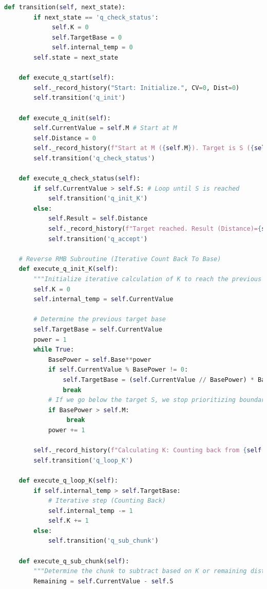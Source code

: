 \documentclass[11pt]{article}
\begin{document}
\begin{lstlisting}[language=Python]
    def transition(self, next_state):
        if next_state == 'q_check_status':
             self.K = 0
             self.TargetBase = 0
             self.internal_temp = 0
        self.state = next_state

    def execute_q_start(self):
        self._record_history("Start: Initialize.", CV=0, Dist=0)
        self.transition('q_init')

    def execute_q_init(self):
        self.CurrentValue = self.M # Start at M
        self.Distance = 0
        self._record_history(f"Start at M ({self.M}). Target is S ({self.S}).", CV=self.CurrentValue, Dist=self.Distance)
        self.transition('q_check_status')

    def execute_q_check_status(self):
        if self.CurrentValue > self.S: # Loop until S is reached
            self.transition('q_init_K')
        else:
            self.Result = self.Distance
            self._record_history(f"Target reached. Result (Distance)={self.Result}.", CV=self.CurrentValue, Dist=self.Distance)
            self.transition('q_accept')

    # Reverse RMB Subroutine (Iterative Count Back To Base)
    def execute_q_init_K(self):
        """Initialize iterative calculation of K to reach the previous base."""
        self.K = 0
        self.internal_temp = self.CurrentValue

        # Determine the previous target base
        self.TargetBase = self.CurrentValue
        power = 1
        while True:
            BasePower = self.Base**power
            if self.CurrentValue % BasePower != 0:
                self.TargetBase = (self.CurrentValue // BasePower) * BasePower
                break
            # If we go below the target S, we stop prioritizing boundaries.
            if BasePower > self.M:
                 break
            power += 1

        self._record_history(f"Calculating K: Counting back from {self.CurrentValue} to {self.TargetBase}.", CV=self.CurrentValue, Dist=self.Distance, K=0)
        self.transition('q_loop_K')

    def execute_q_loop_K(self):
        if self.internal_temp > self.TargetBase:
            # Iterative step (Counting Back)
            self.internal_temp -= 1
            self.K += 1
        else:
            self.transition('q_sub_chunk')

    def execute_q_sub_chunk(self):
        """Determine the chunk to subtract based on K or remaining distance."""
        Remaining = self.CurrentValue - self.S


\end{lstlisting}
\end{document}
